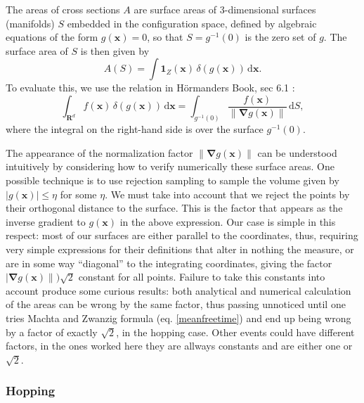\documentclass[superscriptaddress,pre,reprint,showpacs,onecolumn]{revtex4-1}
\newcommand{\indicatorsymbol}{\mathbf{1}}
\begin{document}
The areas of cross sections $A$ are surface areas of 3-dimensional surfaces (manifolds) $S$ embedded in the configuration space,
defined by algebraic equations of the form $g(\mathbf{x}) = 0$, so that $S = g^{-1}(0)$ is the zero set of $g$.
The surface area of $S$ is then given by
\begin{equation}
A(S) = \int \indicatorsymbol_Z(\mathbf{x}) \, \delta(g(\mathbf{x})) \, \mathrm{d} \mathbf{x}.
\label{eq:surface-area}
\end{equation}
To evaluate this, we use the relation in H\"ormanders Book, sec 6.1 \cite{Hormander83}:
\begin{equation}
\int_{\mathbf{R}^d} f(\mathbf{x}) \, \delta(g(\mathbf{x})) \, \mathrm{d} \mathbf{x} = \int_{g^{-1}(0)}\frac{f(\mathbf{x})}{\| \mathbf{\nabla}g(\mathbf{x}) \|} \, \mathrm{d}S,
\label{eq:surface-dirac}
\end{equation}
where the integral on the right-hand side is over the surface $g^{-1}(0)$.

The appearance of the normalization factor $\| \mathbf{\nabla}g(\mathbf{x}) \|$ can be understood intuitively by considering how to verify numerically these surface areas. One possible technique is to use rejection sampling to sample the volume given by $|g(\mathbf{x})| \le \eta$ for some $\eta$. We must take into account that we reject
the points by their orthogonal distance to the surface. This is the factor that appears as the inverse gradient to $g(\mathbf{x})$ in the above expression. Our case is simple in this respect: most of our surfaces are either parallel to the coordinates, thus, requiring very simple expressions for their definitions that alter in nothing the measure, or are in some way ``diagonal'' to the integrating coordinates, giving the factor
$| \mathbf{\nabla}g(\mathbf{x}) \| )\sqrt{2}$ constant for all points. 
Failure to take this constants into account produce some curious results: both analytical
and numerical calculation of the areas can be wrong by the same factor,
thus passing unnoticed until one tries Machta and Zwanzig formula (eq. \ref{meanfreetime}) and end up being wrong by a factor of exactly 
$\sqrt{2}$, in the hopping case. Other events could have different factors, in the ones
worked here they are allways constants and are either one or $\sqrt{2}$.


\subsubsection{Hopping}
\end{document}
